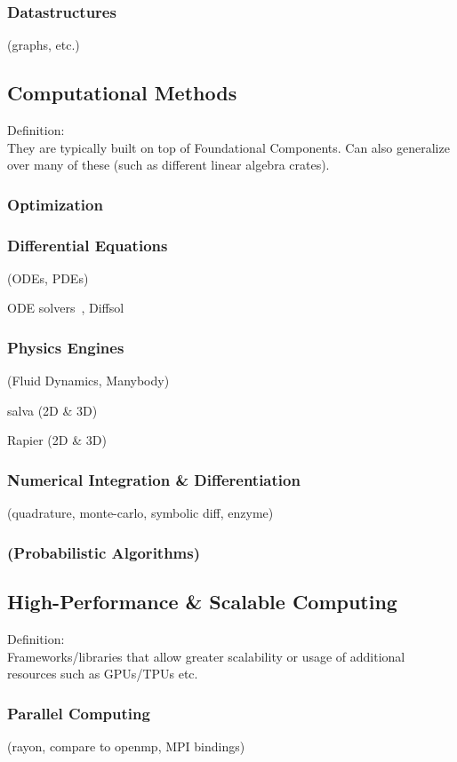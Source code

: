 \documentclass{article}
\begin{document}
\subsubsection{Datastructures}
(graphs, etc.)

\subsection{Computational Methods}
Definition:\\
They are typically built on top of Foundational Components. Can also generalize over
many of these (such as different linear algebra crates).

\subsubsection{Optimization}
\subsubsection{Differential Equations}
(ODEs, PDEs)

ODE solvers~\cite{Renevey2024}, Diffsol

\subsubsection{Physics Engines}
(Fluid Dynamics, Manybody)

salva (2D \& 3D)~\cite{Crozet2024}

Rapier (2D \& 3D)~\cite{Crozet2025}

\subsubsection{Numerical Integration \& Differentiation}
(quadrature, monte-carlo, symbolic diff, enzyme)

\subsubsection{(Probabilistic Algorithms)}

\subsection{High-Performance \& Scalable Computing}
Definition:\\
Frameworks/libraries that allow greater scalability or usage of additional resources
such as GPUs/TPUs etc.

\subsubsection{Parallel Computing}
(rayon, compare to openmp, MPI bindings)
\end{document}
